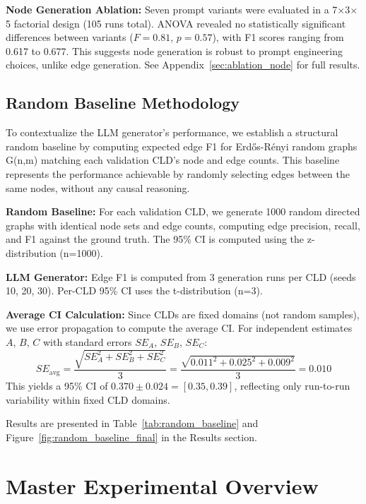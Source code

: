 \textbf{Node Generation Ablation:} Seven prompt variants were evaluated in a 7$\times$3$\times$5 factorial design (105 runs total). ANOVA revealed no statistically significant differences between variants ($F=0.81$, $p=0.57$), with F1 scores ranging from 0.617 to 0.677. This suggests node generation is robust to prompt engineering choices, unlike edge generation. See Appendix~\ref{sec:ablation_node} for full results.

\subsection{Random Baseline Methodology}

To contextualize the LLM generator's performance, we establish a structural random baseline by computing expected edge F1 for Erd\H{o}s-R\'enyi random graphs G(n,m) matching each validation CLD's node and edge counts. This baseline represents the performance achievable by randomly selecting edges between the same nodes, without any causal reasoning.

\textbf{Random Baseline:} For each validation CLD, we generate 1000 random directed graphs with identical node sets and edge counts, computing edge precision, recall, and F1 against the ground truth. The 95\% CI is computed using the z-distribution (n=1000).

\textbf{LLM Generator:} Edge F1 is computed from 3 generation runs per CLD (seeds 10, 20, 30). Per-CLD 95\% CI uses the t-distribution (n=3).

\textbf{Average CI Calculation:} Since CLDs are fixed domains (not random samples), we use error propagation to compute the average CI. For independent estimates $A$, $B$, $C$ with standard errors $SE_A$, $SE_B$, $SE_C$:
\[
SE_{\text{avg}} = \frac{\sqrt{SE_A^2 + SE_B^2 + SE_C^2}}{3} = \frac{\sqrt{0.011^2 + 0.025^2 + 0.009^2}}{3} = 0.010
\]
This yields a 95\% CI of $0.370 \pm 0.024 = [0.35, 0.39]$, reflecting only run-to-run variability within fixed CLD domains.

Results are presented in Table~\ref{tab:random_baseline} and Figure~\ref{fig:random_baseline_final} in the Results section.

\section{Master Experimental Overview}

